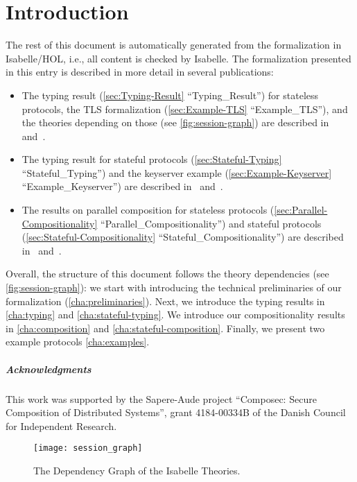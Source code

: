 \documentclass[10pt,DIV16,a4paper,abstract=true,twoside=semi,openright]
{scrreprt}
\begin{document}
\chapter{Introduction}
The rest of this document is automatically generated from the formalization in Isabelle/HOL, i.e., all content is checked by Isabelle.
The formalization presented in this entry is described in more detail in several publications:
\begin{itemize}
\item The typing result (\autoref{sec:Typing-Result} ``Typing\_Result'') for stateless protocols, the TLS formalization (\autoref{sec:Example-TLS} ``Example\_TLS''), and the theories depending on those (see \autoref{fig:session-graph}) are described in~\cite{hess.ea:formalizing:2017} and~\cite[chapter 3]{hess:typing:2018}.
\item The typing result for stateful protocols (\autoref{sec:Stateful-Typing} ``Stateful\_Typing'') and the keyserver example (\autoref{sec:Example-Keyserver} ``Example\_Keyserver'') are described in~\cite{hess.ea:typing:2018} and~\cite[chapter 4]{hess:typing:2018}.
\item The results on parallel composition for stateless protocols (\autoref{sec:Parallel-Compositionality} ``Parallel\_Compositionality'') and stateful protocols (\autoref{sec:Stateful-Compositionality} ``Stateful\_Compositionality'') are described in~\cite{hess.ea:stateful:2018} and~\cite[chapter 5]{hess:typing:2018}.
\end{itemize}
Overall, the structure of this document follows the theory dependencies (see \autoref{fig:session-graph}): we start with introducing the technical preliminaries of our formalization (\autoref{cha:preliminaries}).
Next, we introduce the typing results in \autoref{cha:typing} and \autoref{cha:stateful-typing}.
We introduce our compositionality results in \autoref{cha:composition} and \autoref{cha:stateful-composition}.
Finally, we present two example protocols \autoref{cha:examples}.

\paragraph{Acknowledgments}
This work was supported by the Sapere-Aude project ``Composec: Secure Composition of Distributed Systems'', grant 4184-00334B of the Danish Council for Independent Research.

\clearpage

\begin{figure}
  \centering
  \texttt{[image: session\_graph]}
  \caption{The Dependency Graph of the Isabelle Theories.\label{fig:session-graph}}
\end{figure}
\end{document}

